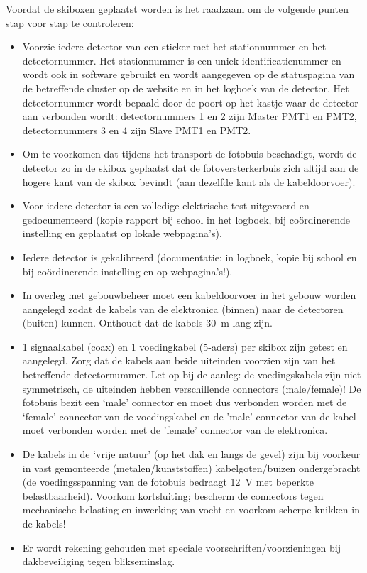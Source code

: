Voordat de skiboxen geplaatst worden is het raadzaam om de volgende
punten stap voor stap te controleren:

\begin{itemize}
    \item Voorzie iedere detector van een sticker met het stationnummer
    en het detectornummer. Het stationnummer is een uniek
    identificatienummer en wordt ook in software gebruikt en wordt
    aangegeven op de statuspagina van de betreffende cluster op de
    \hisparc website en in het logboek van de detector. Het
    detectornummer wordt bepaald door de poort op het \hisparc kastje
    waar de detector aan verbonden wordt: detectornummers 1 en 2 zijn
    Master PMT1 en PMT2, detectornummers 3 en 4 zijn Slave PMT1 en PMT2.
    \item Om te voorkomen dat tijdens het transport de fotobuis
    beschadigt, wordt de detector zo in de skibox geplaatst dat de
    fotoversterkerbuis zich altijd aan de hogere kant van de skibox
    bevindt (aan dezelfde kant als de kabeldoorvoer).
    \item Voor iedere detector is een volledige elektrische test
    uitgevoerd en gedocumenteerd (kopie rapport bij school in het
    logboek, bij coördinerende instelling en geplaatst op lokale
    webpagina’s).
    \item Iedere detector is gekalibreerd (documentatie: in logboek,
    kopie bij school en bij coördinerende instelling en op
    webpagina’s!).
    \item In overleg met gebouwbeheer moet een kabeldoorvoer in het
    gebouw worden aangelegd zodat de kabels van de \hisparc elektronica
    (binnen) naar de detectoren (buiten) kunnen. Onthoudt dat de kabels
    \SI{30}{\meter} lang zijn.
    \item 1 signaalkabel (coax) en 1 voedingkabel (5-aders) per skibox
    zijn getest en aangelegd. Zorg dat de kabels aan beide uiteinden
    voorzien zijn van het betreffende detectornummer. Let op bij de
    aanleg: de voedingskabels zijn niet symmetrisch, de uiteinden hebben
    verschillende connectors (male/female)! De fotobuis bezit een ‘male’
    connector en moet dus verbonden worden met de ‘female’ connector van
    de voedingskabel en de 'male' connector van de kabel moet verbonden
    worden met de 'female' connector van de \hisparc elektronica. 
    \item De kabels in de ‘vrije natuur’ (op het dak en langs de gevel)
    zijn bij voorkeur in vast gemonteerde (metalen/kunststoffen)
    kabelgoten/buizen ondergebracht (de voedingsspanning van de fotobuis
    bedraagt \SI{12}{\volt} met beperkte belastbaarheid). Voorkom
    kortsluiting; bescherm de connectors tegen mechanische belasting en
    inwerking van vocht en voorkom scherpe knikken in de kabels!
    \item Er wordt rekening gehouden met speciale
    voorschriften/voorzieningen bij dakbeveiliging tegen blikseminslag.
\end{itemize}


